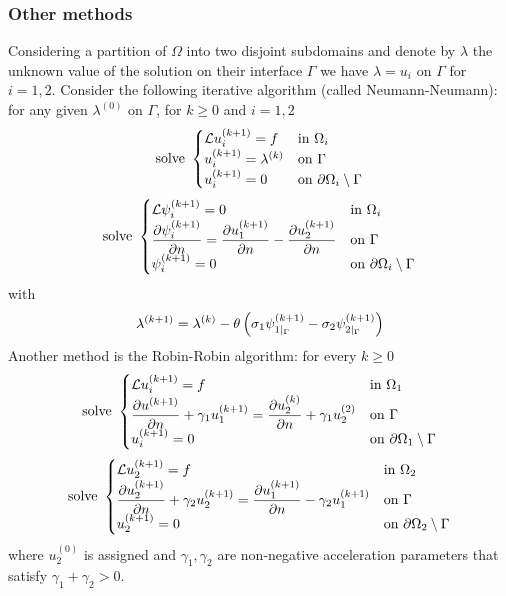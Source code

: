 \subsubsection*{Other methods}
Considering a partition of \(\Omega\) into two disjoint subdomains and denote by \(\lambda\) the unknown value of the solution on their interface \(\Gamma\) we have \(\lambda = u_i\) on \(\Gamma\) for \(i=1,2\).
Consider the following iterative algorithm (called Neumann-Neumann): for any given \(\lambda^{(0)}\) on \(\Gamma\), for \(k \geq 0\) and \(i = 1,2\)
\begin{equation*}
    \text{solve }\begin{cases}
        \mathcal{L} u^{(k+1)}_i = f & \text{in } \Omega_i \\
        u^{(k+1)}_i = \lambda^{(k)} & \text{on } \Gamma \\
        u^{(k+1)}_i = 0 & \text{on } {\partial\Omega}_i\setminus \Gamma
    \end{cases}
\end{equation*}
\begin{equation*}
    \txt{solve }\begin{cases}
        \loperator \psi^{(k+1)}_i = 0 & \txt{in } \Omega_i \\
        \displaystyle \partialderivative{\psi^{(k+1)}_i}{n} = \partialderivative{u_1^{(k+1)}}{n} - \partialderivative{u^{(k+1)}_2}{n} & \txt{on } \Gamma \\
        \psi^{(k+1)}_i = 0 & \txt{on } \boundary_i\setminus \Gamma
    \end{cases}
\end{equation*}
with 
\[
    \lambda^{(k+1)} = \lambda^{(k)} - \theta\left( \sigma_1 \psi^{(k+1)}_{1\vert_{\Gamma}} - \sigma_2\psi^{(k+1)}_{2\vert_{\Gamma}} \right)
\]
Another method is the Robin-Robin algorithm: for every \(k\geq 0\) 
\begin{equation*}
    \txt{solve }\begin{cases}
        \loperator u^{(k+1)}_i = f & \txt{in } \Omega_1 \\
        \displaystyle \partialderivative{u^{(k+1)}}{n} + \gamma_1u_1^{(k+1)} = \partialderivative{u_2^{(k)}}{n} + \gamma_1u_2^{(2)} & \txt{on } \Gamma \\
        u^{(k+1)}_i = 0 & \txt{on } \boundary_1\setminus \Gamma
    \end{cases}
\end{equation*}
\begin{equation*}
    \txt{solve }\begin{cases}
        \loperator u^{(k+1)}_2 = f & \txt{in } \Omega_2 \\
        \displaystyle \partialderivative{u^{(k+1)}_2}{n} + \gamma_2u_2^{(k+1)} = \partialderivative{u_1^{(k+1)}}{n} - \gamma_2u_1^{(k+1)} & \txt{on } \Gamma \\
        u^{(k+1)}_2 = 0 & \txt{on } \boundary_2\setminus \Gamma
    \end{cases}
\end{equation*}
where \(u^{(0)}_2\) is assigned and \(\gamma_1,\gamma_2\) are non-negative acceleration parameters that satisfy \(\gamma_1+\gamma_2 > 0\). 
